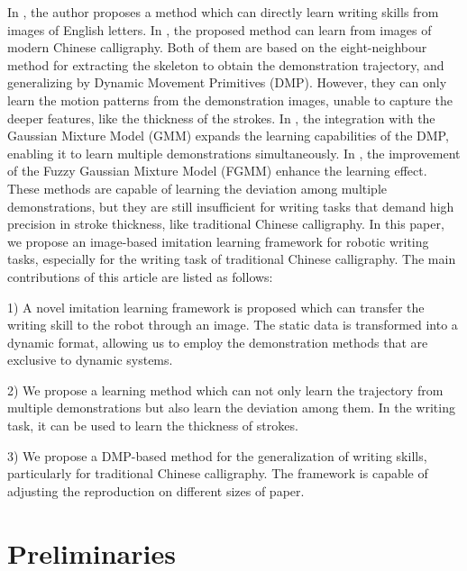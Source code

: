 \documentclass[conference]{IEEEtran}
\begin{document}
In \cite{Zhang2023}, the author proposes a method which can directly learn writing skills from images of English letters. In \cite{Li2021, Li2022, Li2024}, the proposed method can learn from images of modern Chinese calligraphy. Both of them are based on the eight-neighbour method for extracting the skeleton to obtain the demonstration trajectory, and generalizing by Dynamic Movement Primitives (DMP)\cite{Ijspeert2013}. However, they can only learn the motion patterns from the demonstration images, unable to capture the deeper features, like the thickness of the strokes. In \cite{Yang2019}, the integration with the Gaussian Mixture Model (GMM) expands the learning capabilities of the DMP, enabling it to learn multiple demonstrations simultaneously. In \cite{Yang2019c}, the improvement of the Fuzzy Gaussian Mixture Model (FGMM)\cite{Ju2012} enhance the learning effect. These methods are capable of learning the deviation among multiple demonstrations, but they are still insufficient for writing tasks that demand high precision in stroke thickness, like traditional Chinese calligraphy. In this paper, we propose an image-based imitation learning framework for robotic writing tasks, especially for the writing task of traditional Chinese calligraphy. The main contributions of this article are listed as follows:

1) A novel imitation learning framework is proposed which can transfer the writing skill to the robot through an image. The static data is transformed into a dynamic format, allowing us to employ the demonstration methods that are exclusive to dynamic systems.

2) We propose a learning method which can not only learn the trajectory from multiple demonstrations but also learn the deviation among them. In the writing task, it can be used to learn the thickness of strokes.

3) We propose a DMP-based method for the generalization of writing skills, particularly for traditional Chinese calligraphy. The framework is capable of adjusting the reproduction on different sizes of paper.

\section{Preliminaries}
\end{document}
